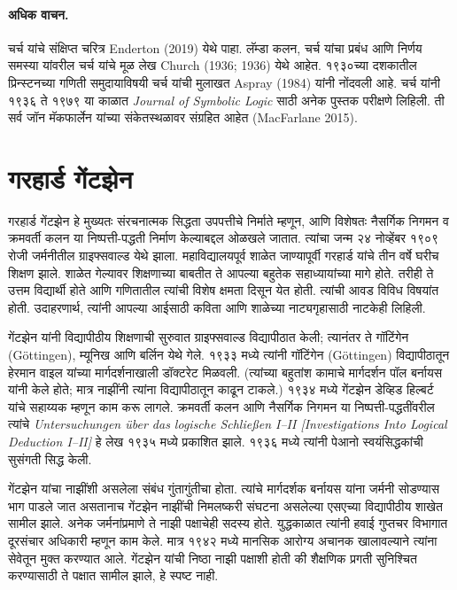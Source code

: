 \paragraph{अधिक वाचन.}
चर्च यांचे संक्षिप्त चरित्र Enderton (2019) येथे पाहा. लॅम्डा कलन, चर्च यांचा प्रबंध आणि निर्णय समस्या यांवरील चर्च यांचे मूळ लेख Church (1936; 1936) येथे आहेत. १९३०च्या दशकातील प्रिन्स्टनच्या गणिती समुदायाविषयी चर्च यांची मुलाखत Aspray (1984) यांनी नोंदवली आहे. चर्च यांनी १९३६ ते १९७९ या काळात \emph{Journal of Symbolic Logic} साठी अनेक पुस्तक परीक्षणे लिहिली. ती सर्व जॉन मॅकफार्लेन यांच्या संकेतस्थळावर संग्रहित आहेत (MacFarlane 2015).













\section{गरहार्ड गेंटझेन}\label{his:bio:gen:sec}



गरहार्ड गेंटझेन हे मुख्यतः संरचनात्मक सिद्धता उपपत्तीचे निर्माते म्हणून, आणि विशेषतः नैसर्गिक निगमन व क्रमवर्ती कलन या निष्पत्ती-पद्धती निर्माण केल्याबद्दल ओळखले जातात. त्यांचा जन्म २४ नोव्हेंबर १९०९ रोजी जर्मनीतील ग्राइफ्सवाल्ड येथे झाला. महाविद्यालयपूर्व शाळेत जाण्यापूर्वी गरहार्ड यांचे तीन वर्षे घरीच शिक्षण झाले. शाळेत गेल्यावर शिक्षणाच्या बाबतीत ते आपल्या बहुतेक सहाध्यायांच्या मागे होते. तरीही ते उत्तम विद्यार्थी होते आणि गणितातील त्यांची विशेष क्षमता दिसून येत होती. त्यांची आवड विविध विषयांत होती. उदाहरणार्थ, त्यांनी आपल्या आईसाठी कविता आणि शाळेच्या नाट्यगृहासाठी नाटकेही लिहिली.

गेंटझेन यांनी विद्यापीठीय शिक्षणाची सुरुवात ग्राइफ्सवाल्ड विद्यापीठात केली; त्यानंतर ते गॉटिंगेन (G\"{o}ttingen), म्यूनिख आणि बर्लिन येथे गेले. १९३३ मध्ये त्यांनी गॉटिंगेन (G\"{o}ttingen) विद्यापीठातून हेरमान वाइल यांच्या मार्गदर्शनाखाली डॉक्टरेट मिळवली. (त्यांच्या बहुतांश कामाचे मार्गदर्शन पॉल बर्नायस यांनी केले होते; मात्र नाझींनी त्यांना विद्यापीठातून काढून टाकले.) १९३४ मध्ये गेंटझेन डेव्हिड हिल्बर्ट यांचे सहाय्यक म्हणून काम करू लागले. क्रमवर्ती कलन आणि नैसर्गिक निगमन या निष्पत्ती-पद्धतींवरील त्यांचे \emph{Untersuchungen \"{u}ber das logische Schlie\ss en I--II
  [Investigations Into Logical Deduction I--II]} हे लेख १९३५ मध्ये प्रकाशित झाले. १९३६ मध्ये त्यांनी पेआनो स्वयंसिद्धकांची सुसंगती सिद्ध केली.

गेंटझेन यांचा नाझींशी असलेला संबंध गुंतागुंतीचा होता. त्यांचे मार्गदर्शक बर्नायस यांना जर्मनी सोडण्यास भाग पाडले जात असतानाच गेंटझेन नाझींची निमलष्करी संघटना असलेल्या एसएच्या विद्यापीठीय शाखेत सामील झाले. अनेक जर्मनांप्रमाणे ते नाझी पक्षाचेही सदस्य होते. युद्धकाळात त्यांनी हवाई गुप्तचर विभागात दूरसंचार अधिकारी म्हणून काम केले. मात्र १९४२ मध्ये मानसिक आरोग्य अचानक खालावल्याने त्यांना सेवेतून मुक्त करण्यात आले. गेंटझेन यांची निष्ठा नाझी पक्षाशी होती की शैक्षणिक प्रगती सुनिश्चित करण्यासाठी ते पक्षात सामील झाले, हे स्पष्ट नाही.

